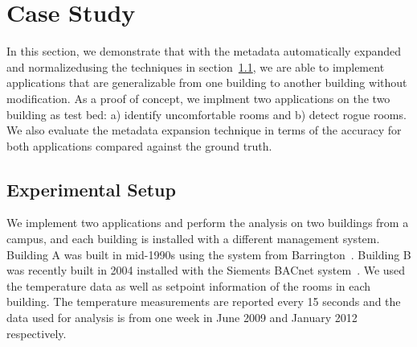 \section{Case Study}
In this section, we demonstrate that with the metadata automatically expanded and normalizedusing the techniques in section~\ref{}, we are able to implement applications that are generalizable from one building to another building without modification. As a proof of concept, we implment two applications on the two building as test bed: a) identify uncomfortable rooms and b) detect rogue rooms. We also evaluate the metadata expansion technique in terms of the accuracy for both applications compared against the ground truth. 

\subsection{Experimental Setup}
We implement two applications and perform the analysis on two buildings from a campus, and each building is installed with a different management system. Building A was built in mid-1990s using the system from Barrington~\cite{}. Building B was recently built in 2004 installed with the Siements BACnet system~\cite{}. We used the temperature data as well as setpoint information of the rooms in each building. The temperature measurements are reported every 15 seconds and the data used for analysis is from one week in June 2009 and January 2012 respectively.


